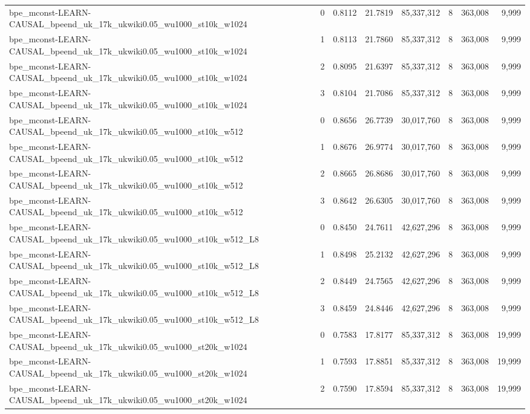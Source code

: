 \begin{tabular}{lrrrrrrr}
bpe\_mconst-LEARN-CAUSAL\_bpeend\_uk\_17k\_ukwiki0.05\_wu1000\_st10k\_w1024 & 0 & 0.8112 & 21.7819 & 85,337,312 & 8 & 363,008 & 9,999 \\
bpe\_mconst-LEARN-CAUSAL\_bpeend\_uk\_17k\_ukwiki0.05\_wu1000\_st10k\_w1024 & 1 & 0.8113 & 21.7860 & 85,337,312 & 8 & 363,008 & 9,999 \\
bpe\_mconst-LEARN-CAUSAL\_bpeend\_uk\_17k\_ukwiki0.05\_wu1000\_st10k\_w1024 & 2 & 0.8095 & 21.6397 & 85,337,312 & 8 & 363,008 & 9,999 \\
bpe\_mconst-LEARN-CAUSAL\_bpeend\_uk\_17k\_ukwiki0.05\_wu1000\_st10k\_w1024 & 3 & 0.8104 & 21.7086 & 85,337,312 & 8 & 363,008 & 9,999 \\
bpe\_mconst-LEARN-CAUSAL\_bpeend\_uk\_17k\_ukwiki0.05\_wu1000\_st10k\_w512 & 0 & 0.8656 & 26.7739 & 30,017,760 & 8 & 363,008 & 9,999 \\
bpe\_mconst-LEARN-CAUSAL\_bpeend\_uk\_17k\_ukwiki0.05\_wu1000\_st10k\_w512 & 1 & 0.8676 & 26.9774 & 30,017,760 & 8 & 363,008 & 9,999 \\
bpe\_mconst-LEARN-CAUSAL\_bpeend\_uk\_17k\_ukwiki0.05\_wu1000\_st10k\_w512 & 2 & 0.8665 & 26.8686 & 30,017,760 & 8 & 363,008 & 9,999 \\
bpe\_mconst-LEARN-CAUSAL\_bpeend\_uk\_17k\_ukwiki0.05\_wu1000\_st10k\_w512 & 3 & 0.8642 & 26.6305 & 30,017,760 & 8 & 363,008 & 9,999 \\
bpe\_mconst-LEARN-CAUSAL\_bpeend\_uk\_17k\_ukwiki0.05\_wu1000\_st10k\_w512\_L8 & 0 & 0.8450 & 24.7611 & 42,627,296 & 8 & 363,008 & 9,999 \\
bpe\_mconst-LEARN-CAUSAL\_bpeend\_uk\_17k\_ukwiki0.05\_wu1000\_st10k\_w512\_L8 & 1 & 0.8498 & 25.2132 & 42,627,296 & 8 & 363,008 & 9,999 \\
bpe\_mconst-LEARN-CAUSAL\_bpeend\_uk\_17k\_ukwiki0.05\_wu1000\_st10k\_w512\_L8 & 2 & 0.8449 & 24.7565 & 42,627,296 & 8 & 363,008 & 9,999 \\
bpe\_mconst-LEARN-CAUSAL\_bpeend\_uk\_17k\_ukwiki0.05\_wu1000\_st10k\_w512\_L8 & 3 & 0.8459 & 24.8446 & 42,627,296 & 8 & 363,008 & 9,999 \\
bpe\_mconst-LEARN-CAUSAL\_bpeend\_uk\_17k\_ukwiki0.05\_wu1000\_st20k\_w1024 & 0 & 0.7583 & 17.8177 & 85,337,312 & 8 & 363,008 & 19,999 \\
bpe\_mconst-LEARN-CAUSAL\_bpeend\_uk\_17k\_ukwiki0.05\_wu1000\_st20k\_w1024 & 1 & 0.7593 & 17.8851 & 85,337,312 & 8 & 363,008 & 19,999 \\
bpe\_mconst-LEARN-CAUSAL\_bpeend\_uk\_17k\_ukwiki0.05\_wu1000\_st20k\_w1024 & 2 & 0.7590 & 17.8594 & 85,337,312 & 8 & 363,008 & 19,999 \\

\end{tabular}
